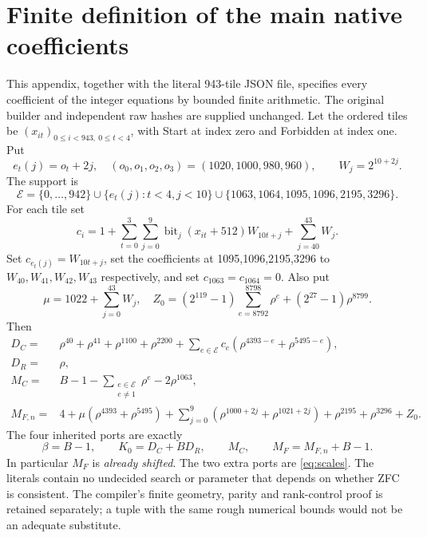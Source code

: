 \documentclass[11pt]{article}
\theoremstyle{definition}\newtheorem{definition}[theorem]{Definition}
\theoremstyle{remark}\newtheorem{remark}[theorem]{Remark}
\begin{document}
\appendix
\section{Finite definition of the main native coefficients}
\label{app:coeff}

This appendix, together with the literal 943-tile JSON file, specifies
every coefficient of the integer equations by bounded finite arithmetic.
The original builder and independent raw hashes are supplied unchanged.
Let the ordered tiles be $(x_{it})_{0\le i<943,\ 0\le t<4}$, with Start
at index zero and Forbidden at index one. Put
\[
 e_t(j)=o_t+2j,\quad(o_0,o_1,o_2,o_3)=(1020,1000,980,960),
 \qquad W_j=2^{10+2j}.
\]
The support is
\[
 \mathcal E=\{0,\ldots,942\}\cup\{e_t(j):t<4,j<10\}
 \cup\{1063,1064,1095,1096,2195,3296\}.
\]
For each tile set
\[
 c_i=1+\sum_{t=0}^{3}\sum_{j=0}^{9}
          \operatorname{bit}_j(x_{it}+512)W_{10t+j}
          +\sum_{j=40}^{43}W_j.
\]
Set $c_{e_t(j)}=W_{10t+j}$, set the coefficients at
1095,1096,2195,3296 to $W_{40},W_{41},W_{42},W_{43}$ respectively,
and set $c_{1063}=c_{1064}=0$. Also put
\[
 \mu=1022+\sum_{j=0}^{43}W_j,\quad
 Z_0=(2^{119}-1)\sum_{e=8792}^{8798}\rho^e+(2^{27}-1)\rho^{8799}.
\]
Then
\begin{align*}
 D_C={}&\rho^{40}+\rho^{41}+\rho^{1100}+\rho^{2200}
       +\sum_{e\in\mathcal E}c_e(\rho^{4393-e}+\rho^{5495-e}),\\
 D_R={}&\rho,\\
 M_C={}&B-1-\sum_{\substack{e\in\mathcal E\\e\ne1}}\rho^e-2\rho^{1063},\\
 M_{F,n}={}&4+\mu(\rho^{4393}+\rho^{5495})
     +\sum_{j=0}^{9}(\rho^{1000+2j}+\rho^{1021+2j})
     +\rho^{2195}+\rho^{3296}+Z_0.
\end{align*}
The four inherited ports are exactly
\[
 \beta=B-1,\qquad K_0=D_C+BD_R,\qquad M_C,
 \qquad M_F=M_{F,n}+B-1.
\]
In particular $M_F$ is \emph{already shifted}. The two extra ports are
\eqref{eq:scales}. The literals contain no undecided search or parameter
that depends on whether ZFC is consistent. The compiler's finite
geometry, parity and rank-control proof is retained separately; a tuple
with the same rough numerical bounds would not be an adequate substitute.
\end{document}
